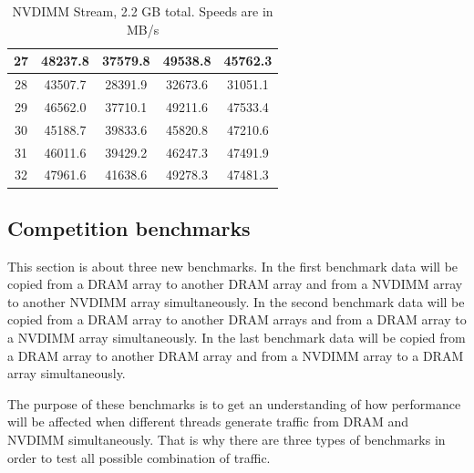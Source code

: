 \documentclass[12pt,a4paper,USenglish]{article}      %
\begin{document}
\begin{table}[!hbtp]
\begin{tabular}{ |c|c|c|c|c| }
\hline
27 & 48237.8 & 37579.8 & 49538.8 & 45762.3 \\
\hline
28 & 43507.7 & 28391.9 & 32673.6 & 31051.1 \\
\hline
29 & 46562.0 & 37710.1 & 49211.6 & 47533.4 \\
\hline
30 & 45188.7 & 39833.6 & 45820.8 & 47210.6 \\
\hline
31 & 46011.6 & 39429.2 & 46247.3 & 47491.9 \\
\hline
32 & 47961.6 & 41638.6 & 49278.3 & 47481.3 \\
\hline
\end{tabular}
\caption{NVDIMM Stream, 2.2 GB total. Speeds are in MB/s}
\label{tab:NVM_STREAM_100M_Table}
\end{table}

\pagebreak
\subsection{Competition benchmarks}
This section is about three new benchmarks. In the first benchmark data will be copied from a DRAM array to another DRAM array and from a NVDIMM array to another NVDIMM array simultaneously. In the second benchmark data will be copied from a DRAM array to another DRAM arrays and from a DRAM array to a NVDIMM array simultaneously. In the last benchmark data will be copied from a DRAM array to another DRAM array and from a NVDIMM array to a DRAM array simultaneously.

The purpose of these benchmarks is to get an understanding of how performance will be affected when different threads generate traffic from DRAM and NVDIMM simultaneously. That is why there are three types of benchmarks in order to test all possible combination of traffic. 
\end{document}
